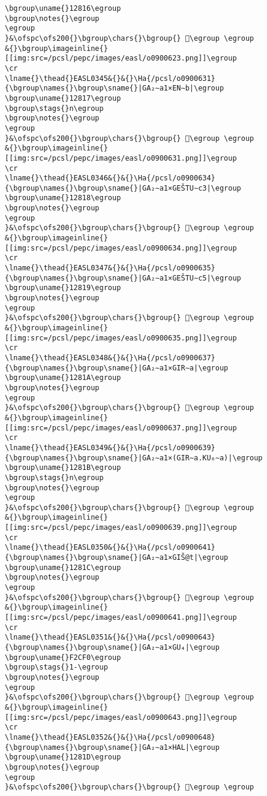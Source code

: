 \begin{verbatim}
\bgroup\uname{}12816\egroup
\bgroup\notes{}\egroup
\egroup
}&\ofspc\ofs200{}\bgroup\chars{}\bgroup{} 𒠖\egroup \egroup
&{}\bgroup\imageinline{}[[img:src=/pcsl/pepc/images/easl/o0900623.png]]\egroup
\cr
\lname{}\thead{}EASL0345&{}&{}\Ha{/pcsl/o0900631}{\bgroup\names{}\bgroup\sname{}|GA₂∼a1×EN∼b|\egroup
\bgroup\uname{}12817\egroup
\bgroup\stags{}n\egroup
\bgroup\notes{}\egroup
\egroup
}&\ofspc\ofs200{}\bgroup\chars{}\bgroup{} 𒠗\egroup \egroup
&{}\bgroup\imageinline{}[[img:src=/pcsl/pepc/images/easl/o0900631.png]]\egroup
\cr
\lname{}\thead{}EASL0346&{}&{}\Ha{/pcsl/o0900634}{\bgroup\names{}\bgroup\sname{}|GA₂∼a1×GEŠTU∼c3|\egroup
\bgroup\uname{}12818\egroup
\bgroup\notes{}\egroup
\egroup
}&\ofspc\ofs200{}\bgroup\chars{}\bgroup{} 𒠘\egroup \egroup
&{}\bgroup\imageinline{}[[img:src=/pcsl/pepc/images/easl/o0900634.png]]\egroup
\cr
\lname{}\thead{}EASL0347&{}&{}\Ha{/pcsl/o0900635}{\bgroup\names{}\bgroup\sname{}|GA₂∼a1×GEŠTU∼c5|\egroup
\bgroup\uname{}12819\egroup
\bgroup\notes{}\egroup
\egroup
}&\ofspc\ofs200{}\bgroup\chars{}\bgroup{} 𒠙\egroup \egroup
&{}\bgroup\imageinline{}[[img:src=/pcsl/pepc/images/easl/o0900635.png]]\egroup
\cr
\lname{}\thead{}EASL0348&{}&{}\Ha{/pcsl/o0900637}{\bgroup\names{}\bgroup\sname{}|GA₂∼a1×GIR∼a|\egroup
\bgroup\uname{}1281A\egroup
\bgroup\notes{}\egroup
\egroup
}&\ofspc\ofs200{}\bgroup\chars{}\bgroup{} 𒠚\egroup \egroup
&{}\bgroup\imageinline{}[[img:src=/pcsl/pepc/images/easl/o0900637.png]]\egroup
\cr
\lname{}\thead{}EASL0349&{}&{}\Ha{/pcsl/o0900639}{\bgroup\names{}\bgroup\sname{}|GA₂∼a1×(GIR∼a.KU₆∼a)|\egroup
\bgroup\uname{}1281B\egroup
\bgroup\stags{}n\egroup
\bgroup\notes{}\egroup
\egroup
}&\ofspc\ofs200{}\bgroup\chars{}\bgroup{} 𒠛\egroup \egroup
&{}\bgroup\imageinline{}[[img:src=/pcsl/pepc/images/easl/o0900639.png]]\egroup
\cr
\lname{}\thead{}EASL0350&{}&{}\Ha{/pcsl/o0900641}{\bgroup\names{}\bgroup\sname{}|GA₂∼a1×GIŠ@t|\egroup
\bgroup\uname{}1281C\egroup
\bgroup\notes{}\egroup
\egroup
}&\ofspc\ofs200{}\bgroup\chars{}\bgroup{} 𒠜\egroup \egroup
&{}\bgroup\imageinline{}[[img:src=/pcsl/pepc/images/easl/o0900641.png]]\egroup
\cr
\lname{}\thead{}EASL0351&{}&{}\Ha{/pcsl/o0900643}{\bgroup\names{}\bgroup\sname{}|GA₂∼a1×GU₄|\egroup
\bgroup\uname{}F2CF0\egroup
\bgroup\stags{}1-\egroup
\bgroup\notes{}\egroup
\egroup
}&\ofspc\ofs200{}\bgroup\chars{}\bgroup{} 󲳰\egroup \egroup
&{}\bgroup\imageinline{}[[img:src=/pcsl/pepc/images/easl/o0900643.png]]\egroup
\cr
\lname{}\thead{}EASL0352&{}&{}\Ha{/pcsl/o0900648}{\bgroup\names{}\bgroup\sname{}|GA₂∼a1×HAL|\egroup
\bgroup\uname{}1281D\egroup
\bgroup\notes{}\egroup
\egroup
}&\ofspc\ofs200{}\bgroup\chars{}\bgroup{} 𒠝\egroup \egroup

\end{verbatim}
